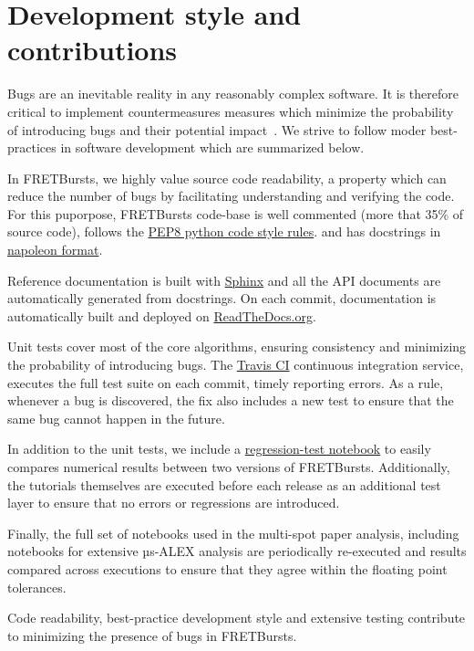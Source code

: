 \section{Development style and contributions}

Bugs are an inevitable reality in any reasonably complex software. It is 
therefore critical to implement countermeasures measures which
minimize the probability of introducing bugs and their potential impact~\cite{Prli__2012}.
We strive to follow moder best-practices in software development which are summarized 
below.

In FRETBursts, we highly value source code readability, a property which can 
reduce the number of bugs by facilitating understanding and verifying the code.
For this puporpose, FRETBursts code-base is well commented (more that 35\%
of source code), 
follows the  \href{https://www.python.org/dev/peps/pep-0008/}{PEP8 python code style rules}.
and has docstrings in \href{http://sphinxcontrib-napoleon.readthedocs.org/}{napoleon format}.

Reference documentation is built with \href{http://sphinx-doc.org/}{Sphinx} and
all the API documents are automatically generated from docstrings.
On each commit, documentation is automatically built and deployed on
\href{https://readthedocs.org/}{ReadTheDocs.org}.

Unit tests cover most of the core algorithms, ensuring consistency and
minimizing the probability of introducing bugs. 
The \href{http://travis-ci.org}{Travis CI} continuous integration service, 
executes the full test suite on each commit, timely reporting errors.
As a rule, whenever a bug is discovered, the  fix also includes a new test
to ensure that the same bug cannot happen in the future.

In addition to the unit tests, we include a
\href{https://github.com/tritemio/FRETBursts/blob/master/notebooks/dev/tests/FRETBursts\%20-\%20Regression\%20tests.ipynb}{regression-test notebook}
to easily compares numerical results between two versions of FRETBursts. 
Additionally, the tutorials themselves are executed before each release as
an additional test layer to ensure that no errors or regressions are introduced.

Finally, the full set of notebooks used in the multi-spot paper analysis,
including notebooks for extensive µs-ALEX analysis are periodically
re-executed and results compared across executions to ensure that
they agree within the floating point tolerances.

Code readability, best-practice development style and extensive testing
contribute to minimizing the presence of bugs in FRETBursts.

